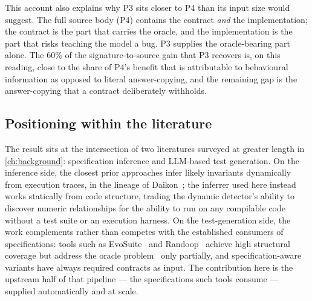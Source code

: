 This account also explains why P3 sits closer to P4 than its input size would
suggest. The full source body (P4) contains the contract \emph{and} the
implementation; the contract is the part that carries the oracle, and the
implementation is the part that risks teaching the model a bug. P3 supplies the
oracle-bearing part alone. The 60\% of the signature-to-source gain that P3
recovers is, on this reading, close to the share of P4's benefit that is
attributable to behavioural information as opposed to literal answer-copying, and
the remaining gap is the answer-copying that a contract deliberately withholds.

\subsection{Positioning within the literature}
\label{sec:art1:related}

The result sits at the intersection of two literatures surveyed at greater length
in \cref{ch:background}: specification inference and LLM-based test generation. On
the inference side, the closest prior approaches infer likely invariants
dynamically from execution traces, in the lineage of
Daikon~\citep{ernst2007daikon}; the inferrer used here instead works statically
from code structure, trading the dynamic detector's ability to discover numeric
relationships for the ability to run on any compilable code without a test suite or
an execution harness. On the test-generation side, the work complements rather than
competes with the established consumers of specifications: tools such as
EvoSuite~\citep{fraser2011evosuite} and Randoop~\citep{pacheco2007randoop} achieve
high structural coverage but address the oracle problem~\citep{barr2015oracle} only
partially, and specification-aware variants have always required contracts as
input. The contribution here is the upstream half of that pipeline --- the
specifications such tools consume --- supplied automatically and at scale.

